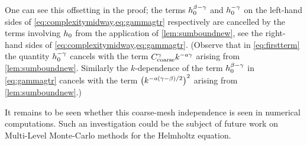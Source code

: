 One can see this offsetting in the proof; the terms $h_{0}^{\beta-\gamma}$ and $h_{0}^{-\gamma}$ on the left-hand sides of  \cref{eq:complexitymidway,eq:gammagtr} respectively are cancelled by the terms involving $h_{0}$ from the application of \cref{lem:sumboundnew}, see the right-hand sides of \cref{eq:complexitymidway,eq:gammagtr}. (Observe that in \cref{eq:firstterm} the quantity $h_{0}^{-\gamma}$ cancels with the term $C_{\mathrm{coarse}}^{\gamma}k^{-a\gamma}$ arising from \cref{lem:sumboundnew}. Similarly the $k$-dependence of the term $h_{0}^{\beta-\gamma}$ in \cref{eq:gammagtr} cancels with the term $\mleft(k^{-a(\gamma-\beta)/2}\mright)^2$ arising from \ref{lem:sumboundnew}.)

It remains to be seen whether this coarse-mesh independence is seen in numerical computations. Such an investigation could be the subject of future work on Multi-Level Monte-Carlo methods for the Helmholtz equation.
\ere

